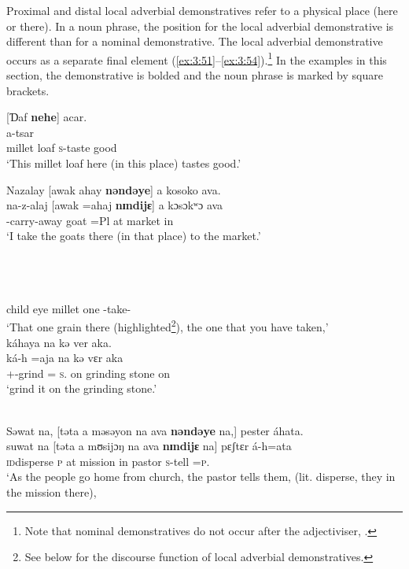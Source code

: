 Proximal and distal local adverbial demonstratives refer to a physical place (here or there). In a noun phrase, the position for the local adverbial demonstrative is different than for a nominal demonstrative. The local adverbial demonstrative occurs as a separate final element (\ref{ex:3:51}--\ref{ex:3:54}).\footnote{Note that nominal demonstratives do not occur after the adjectiviser, .} In the examples in this section, the demonstrative is bolded and the noun phrase is marked by square brackets.

\ea \label{ex:3:51}
[Ɗaf  \textbf{nehe}]  acar.\\
  a-tsar\\
      {millet loaf}    {\DEM}  {\textsc{s}-taste good}\\
\glt  ‘This millet loaf here (in this place) tastes good.’
\z

\ea \label{ex:3:52}
      Nazalay      [awak  ahay  \textbf{nəndəye}]  a  kosoko  ava.\\
\gll  na-z-alaj    [awak  =ahaj  \textbf{nɪndijɛ}]  a  kɔsɔkʷɔ  ava\\
      {\oneS}-carry-away  goat  =Pl  {\DEM}    at  market  in\\
\glt  ‘I take the goats there (in that place) to the market.’
\z

\ea \label{ex:3:53}\\\\
\\
      child   eye   millet  one     {\ADJ}   {\DEM}    {\twoS}    {\DEP}-take-{\CL}   {\PSP}\\
\glt  ‘That one grain there (highlighted\footnote{See below for the discourse function of local adverbial demonstratives.}), the one that you have taken,’\\
\medskip
\largerpage
káhaya  na  kə  ver  aka.\\
\gll ká-h  =aja     na       kə       vɛr        aka\\
{\twoS}+{\IFV}-grind ={\PLU}  \textsc{s}.{\DO}  on   {grinding stone}  on\\
\glt ‘grind it on the grinding stone.’
\z

\ea \label{ex:3:54}\\ 
Səwat  na, [təta  a  məsəyon  na  ava  \textbf{nəndəye}  na,]  pester  áhata.\\
\gll  suwat  na   [təta  a  mʊsijɔŋ   na   ava  \textbf{nɪndijɛ}  na]  pɛʃtɛr  á-h=ata\\
      \textsc{id}disperse  {\PSP}  \textsc{p}      at   mission  {\PSP}  in  {\DEM}  {\PSP}  pastor   \textsc{s}-tell   =\textsc{p}.{\IO}\\
\glt  ‘As the people go home from church, the pastor tells them, (lit. disperse, they in the mission there), 
\z

